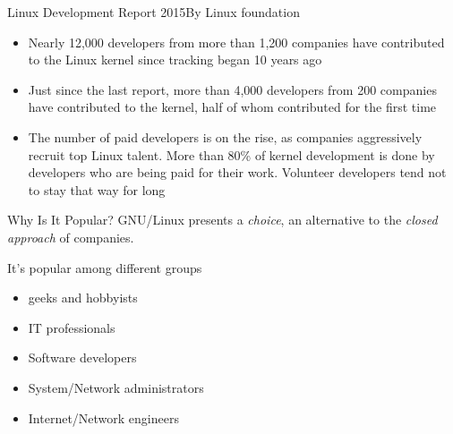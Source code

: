 \begin{frame}{Linux Development Report 2015}{By Linux foundation}
  \begin{itemize}
  \item Nearly 12,000 developers from more than 1,200 companies have contributed to the
    Linux kernel since tracking began 10 years ago
  \item Just since the last report, more than 4,000 developers from 200 companies have
    contributed to the kernel, half of whom contributed for the first time
  \item The number of paid developers is on the rise, as companies aggressively recruit
    top Linux talent. More than 80\% of kernel development is done by developers who
    are being paid for their work. Volunteer developers tend not to stay that way for long
  \end{itemize}
\end{frame}

\begin{frame}{Why Is It Popular?}
  GNU/Linux presents a \emph{choice}, an alternative to the
  \emph{closed approach} of companies.
  \begin{block}{It's popular among different groups}
    \begin{itemize}
    \item geeks and hobbyists
    \item IT professionals
    \item Software developers
    \item System/Network administrators
    \item Internet/Network engineers
    \end{itemize}
  \end{block}

  \begin{center}
    {}
  \end{center}
\end{frame}

